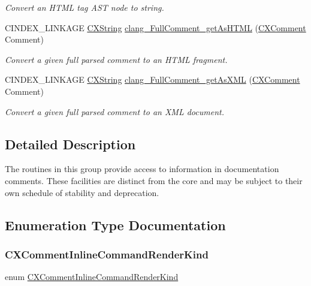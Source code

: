 \begin{DoxyCompactItemize}
\begin{DoxyCompactList}\small\item\em Convert an H\+T\+ML tag A\+ST node to string. \end{DoxyCompactList}\item 
C\+I\+N\+D\+E\+X\+\_\+\+L\+I\+N\+K\+A\+GE \hyperlink{structCXString}{C\+X\+String} \hyperlink{group__CINDEX__COMMENT_gafdfc03bbfdddd06c380a2644f16ccba9}{clang\+\_\+\+Full\+Comment\+\_\+get\+As\+H\+T\+ML} (\hyperlink{structCXComment}{C\+X\+Comment} Comment)
\begin{DoxyCompactList}\small\item\em Convert a given full parsed comment to an H\+T\+ML fragment. \end{DoxyCompactList}\item 
C\+I\+N\+D\+E\+X\+\_\+\+L\+I\+N\+K\+A\+GE \hyperlink{structCXString}{C\+X\+String} \hyperlink{group__CINDEX__COMMENT_gac877b07be05f591fdfea05f466ed9395}{clang\+\_\+\+Full\+Comment\+\_\+get\+As\+X\+ML} (\hyperlink{structCXComment}{C\+X\+Comment} Comment)
\begin{DoxyCompactList}\small\item\em Convert a given full parsed comment to an X\+ML document. \end{DoxyCompactList}\end{DoxyCompactItemize}


\subsection{Detailed Description}
The routines in this group provide access to information in documentation comments. These facilities are distinct from the core and may be subject to their own schedule of stability and deprecation. 

\subsection{Enumeration Type Documentation}
\mbox{\label{group__CINDEX__COMMENT_ga23efacd9c1e4e286a9f9714e1720fdcf}} 
\subsubsection{\texorpdfstring{C\+X\+Comment\+Inline\+Command\+Render\+Kind}{CXCommentInlineCommandRenderKind}}
{\footnotesize\ttfamily enum \hyperlink{group__CINDEX__COMMENT_ga23efacd9c1e4e286a9f9714e1720fdcf}{C\+X\+Comment\+Inline\+Command\+Render\+Kind}}



